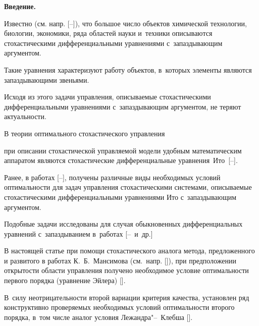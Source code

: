 \date{25/VIII/2016} %







\makerutitle



\textbf{Введение.} 

Известно (см. напр. [--]), что большое число объектов химической технологии, биологии, экономики, ряда областей науки и~техники описываются стохастическими дифференциальными уравнениями с~запаздывающим аргументом. 

Такие уравнения характеризуют работу объектов, в~которых элементы являются запаздывающими звеньями. 

Исходя из этого задачи управления, описываемые стохастическими дифференциальными уравнениями с~запаздывающим аргументом, не теряют актуальности.



В теории оптимального стохастического управления 

при описании стохастической управляемой модели удобным математическим аппаратом являются стохастические дифференциальные уравнения~Ито~[--].

 

Ранее, в работах [--], получены различные виды  необходимых условий оптимальности для задач управления стохастическими системами, описываемые стохастическими дифференциальными  уравнениями Ито с~запаздывающим аргументом. 

Подобные задачи исследованы для случая обыкновенных дифференциальных уравнений с~запаздыванием в~работах [--~и~др.]



В настоящей статье при помощи стохастического аналога метода, предложенного и развитого в работах К.~Б.~Мансимова (см.~напр. []), при предположении открытости области управления  получено необходимое условие оптимальности первого порядка (уравнение Эйлера) []. 

В~силу неотрицательности второй вариации критерия качества, установлен  ряд конструктивно проверяемых необходимых условий оптимальности второго порядка, в~том числе аналог условия Лежандра"--~Клебша [].



